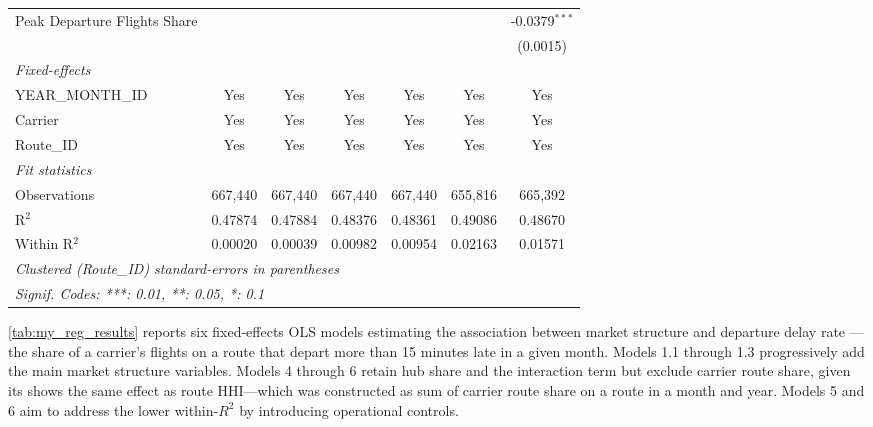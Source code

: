 \documentclass[preprint,12pt,authoryear]{elsarticle}
\begin{document}
\begin{table}[htbp]
\begin{tabular}{lcccccc}
      Peak Departure Flights Share                  &                 &                 &                 &                 &                 & -0.0379$^{***}$\\   
                                        &                 &                 &                 &                 &                 & (0.0015)\\   
      \midrule
      \emph{Fixed-effects}\\
      YEAR\_MONTH\_ID                   & Yes             & Yes             & Yes             & Yes             & Yes             & Yes\\  
      Carrier                           & Yes             & Yes             & Yes             & Yes             & Yes             & Yes\\  
      Route\_ID                         & Yes             & Yes             & Yes             & Yes             & Yes             & Yes\\  
      \midrule
      \emph{Fit statistics}\\
      Observations                      & 667,440         & 667,440         & 667,440         & 667,440         & 655,816         & 665,392\\  
      R$^2$                             & 0.47874         & 0.47884         & 0.48376         & 0.48361         & 0.49086         & 0.48670\\  
      Within R$^2$                      & 0.00020         & 0.00039         & 0.00982         & 0.00954         & 0.02163         & 0.01571\\  
      \midrule \midrule
      \multicolumn{7}{l}{\emph{Clustered (Route\_ID) standard-errors in parentheses}}\\
      \multicolumn{7}{l}{\emph{Signif. Codes: ***: 0.01, **: 0.05, *: 0.1}}\\
   \end{tabular}
\end{table}


\FloatBarrier

\autoref{tab:my_reg_results} reports six fixed-effects OLS models estimating the association between market structure and departure delay rate — the share of a carrier's flights on a route that depart more than 15 minutes late in a given month. Models 1.1 through 1.3 progressively add the main market structure variables. Models 4 through 6 retain hub share and the interaction term but exclude carrier route share, given its shows the same effect as route HHI---which was constructed as sum of carrier route share on a route in a month and year. Models 5 and 6 aim to address the lower within-$R^2$ by introducing operational controls.
\end{document}
